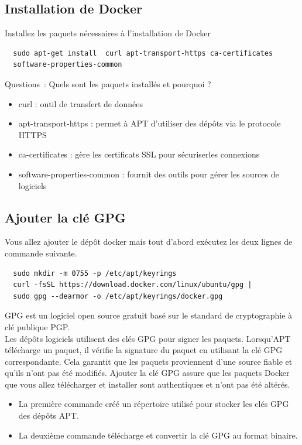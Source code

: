 \subsection*{Installation de Docker}
{}
\noindent Installez les paquets nécessaires à l'installation de Docker
\begin{verbatim}
  sudo apt-get install  curl apt-transport-https ca-certificates
  software-properties-common
\end{verbatim}

Questions~:
Quels sont les paquets installés et pourquoi ?
\begin{itemize}
  \item curl : outil de transfert de données
  \item apt-transport-https : permet à APT d'utiliser des dépôts via le protocole HTTPS
  \item ca-certificates : gère les certificats SSL pour sécuriserles connexions
  \item software-properties-common : fournit des outils pour gérer les sources de logiciels
\end{itemize}

\subsection*{Ajouter la clé GPG}
{}
\noindent Vous allez ajouter le dépôt docker mais tout d'abord exécutez les deux lignes de commande suivante.

\begin{verbatim}
  sudo mkdir -m 0755 -p /etc/apt/keyrings
  curl -fsSL https://download.docker.com/linux/ubuntu/gpg |
  sudo gpg --dearmor -o /etc/apt/keyrings/docker.gpg
\end{verbatim}

\noindent GPG est un logiciel open source gratuit basé sur le standard de cryptographie à clé publique PGP. \\
Les dépôts logiciels utilisent des clés GPG pour signer les paquets. Lorsqu'APT télécharge un paquet, il vérifie la signature du paquet en utilisant la clé GPG correspondante. Cela garantit que les paquets proviennent d'une source fiable et qu'ils n'ont pas été modifiés. Ajouter la clé GPG assure que les paquets Docker que vous allez télécharger et installer sont authentiques et n'ont pas été altérés.
\begin{itemize}
  \item La première commande créé un répertoire utilisé pour stocker les clés GPG des dépôts APT.
  \item La deuxième commande télécharge et convertir la clé GPG au format binaire.
\end{itemize}

